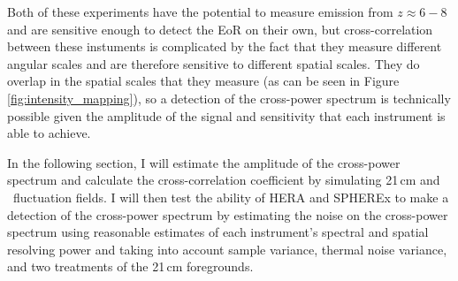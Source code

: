 Both of these experiments have the potential to measure emission from $z \approx 6-8$
and are sensitive enough to detect the EoR on their own, but cross-correlation between
these instuments is complicated by the fact that they measure different angular
scales and are therefore sensitive to different spatial scales. They do overlap
in the spatial scales that they measure (as can be seen in Figure
\ref{fig:intensity_mapping}), so a detection of the cross-power spectrum is technically possible
given the amplitude of the signal and sensitivity that each instrument is able to achieve.

In the following section, I will estimate the amplitude of the cross-power spectrum and
calculate the cross-correlation coefficient by simulating 21\,cm and \lya\ fluctuation
fields. I will then test the ability of HERA and SPHEREx to make a detection of the
cross-power spectrum by estimating the noise on the cross-power spectrum using
reasonable estimates of each instrument's spectral and spatial resolving power and taking into
account sample variance, thermal noise variance, and two treatments of the 21\,cm foregrounds.
